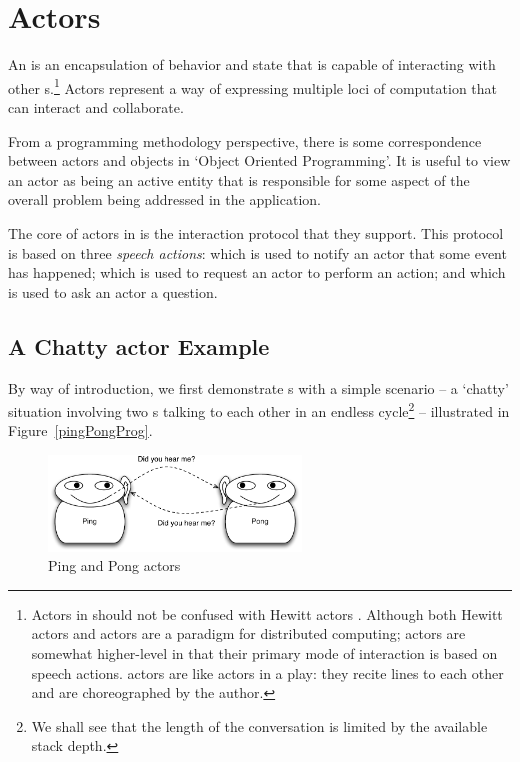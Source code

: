\chapter{Actors}
\label{actors}

An  is an encapsulation of behavior and state that is capable of interacting with other s.\footnote{Actors in \Sr should not be confused with Hewitt actors \cite{agha-hew:87}. Although both Hewitt actors and \Sr actors are a paradigm for distributed computing; \Sr actors are somewhat higher-level in that their primary mode of interaction is based on speech actions. \Sr actors are like actors in a play: they recite lines to each other and are choreographed by the author.} Actors represent a way of expressing multiple loci of computation that can interact and collaborate.

\begin{aside}
From a programming methodology perspective, there is some correspondence between actors and objects in `Object Oriented Programming'.  It is useful to view an actor as being an active entity that is responsible for some aspect of the overall problem being addressed in the application.
\end{aside}

The core of actors in \Sr is the interaction protocol that they support. This protocol is based on three \emph{speech actions}:  which is used to notify an actor that some event has happened;  which is used to request an actor to perform an action; and  which is used to ask an actor a question.

\section{A Chatty actor Example}
\label{talkers}
By way of introduction, we first demonstrate s with a simple scenario -- a `chatty' situation involving two s talking to each other in an endless cycle\footnote{We shall see that the length of the conversation is limited by the available stack depth.} -- illustrated in Figure~\vref{pingPongProg}. 
\begin{figure}[htbp]
\begin{center}
\includegraphics[width=0.6\textwidth]{diagrams/PingAndPong.pdf}
\caption{Ping and Pong actors}
\label{pingPongProg}
\end{center}
\end{figure}

